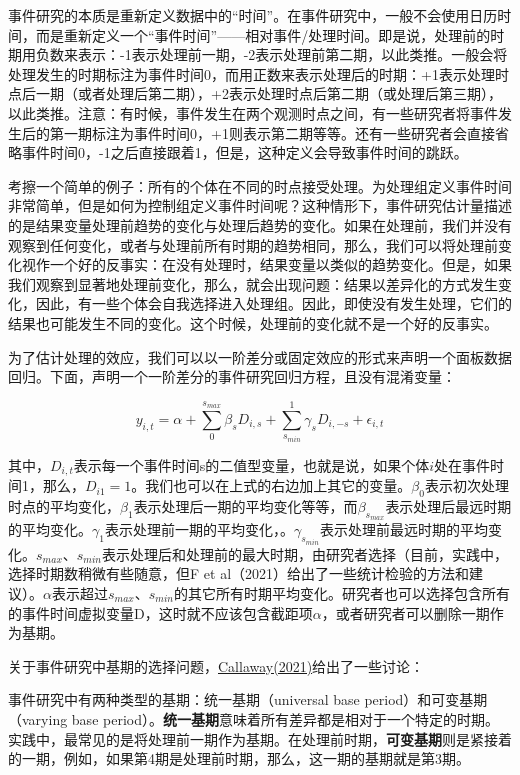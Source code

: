 \documentclass[cn,12pt,math=newtx,citestyle=gb7714-2015,bibstyle=gb7714-2015]{elegantbook}
\begin{document}
	事件研究的本质是重新定义数据中的“时间”。在事件研究中，一般不会使用日历时间，而是重新定义一个“事件时间”——相对事件/处理时间。即是说，处理前的时期用负数来表示：-1表示处理前一期，-2表示处理前第二期，以此类推。一般会将处理发生的时期标注为事件时间0，而用正数来表示处理后的时期：+1表示处理时点后一期（或者处理后第二期），+2表示处理时点后第二期（或处理后第三期），以此类推。注意：有时候，事件发生在两个观测时点之间，有一些研究者将事件发生后的第一期标注为事件时间0，+1则表示第二期等等。还有一些研究者会直接省略事件时间0，-1之后直接跟着1，但是，这种定义会导致事件时间的跳跃。
	
	考擦一个简单的例子：所有的个体在不同的时点接受处理。为处理组定义事件时间非常简单，但是如何为控制组定义事件时间呢？这种情形下，事件研究估计量描述的是结果变量处理前趋势的变化与处理后趋势的变化。如果在处理前，我们并没有观察到任何变化，或者与处理前所有时期的趋势相同，那么，我们可以将处理前变化视作一个好的反事实：在没有处理时，结果变量以类似的趋势变化。但是，如果我们观察到显著地处理前变化，那么，就会出现问题：结果以差异化的方式发生变化，因此，有一些个体会自我选择进入处理组。因此，即使没有发生处理，它们的结果也可能发生不同的变化。这个时候，处理前的变化就不是一个好的反事实。
	
	为了估计处理的效应，我们可以以一阶差分或固定效应的形式来声明一个面板数据回归。下面，声明一个一阶差分的事件研究回归方程，且没有混淆变量：
	
		\begin{equation}
	y_{i,t} = \alpha +\sum_0^{s_{max}} \beta_s D_{i,s} +\sum_{s_{min}}^{1} \gamma_s D_{i,-s}+\epsilon_{i,t}
	\end{equation}
	
	其中，$D_{i,t}$表示每一个事件时间s的二值型变量，也就是说，如果个体$i$处在事件时间1，那么，$D_{i1}=1$。我们也可以在上式的右边加上其它的变量。$\beta_0$表示初次处理时点的平均变化，$\beta_1$表示处理后一期的平均变化等等，而$\beta_{s_{max}}$表示处理后最远时期的平均变化。$\gamma_1$表示处理前一期的平均变化，。$\gamma_{s_{min}}$表示处理前最远时期的平均变化。$s_{max}$、$s_{min}$表示处理后和处理前的最大时期，由研究者选择（目前，实践中，选择时期数稍微有些随意，但F et al（2021）给出了一些统计检验的方法和建议）。$\alpha$表示超过$s_{max}$、$s_{min}$的其它所有时期平均变化。研究者也可以选择包含所有的事件时间虚拟变量D，这时就不应该包含截距项$\alpha$，或者研究者可以删除一期作为基期。
	
	关于事件研究中基期的选择问题，\href{https://bcallaway11.github.io/posts/event-study-universal-v-varying-base-period}{Callaway(2021)}给出了一些讨论：
	
	事件研究中有两种类型的基期：统一基期（universal base period）和可变基期（varying base period）。\textbf{统一基期}意味着所有差异都是相对于一个特定的时期。实践中，最常见的是将处理前一期作为基期。在处理前时期，\textbf{可变基期}则是紧接着的一期，例如，如果第4期是处理前时期，那么，这一期的基期就是第3期。
	
\end{document}

